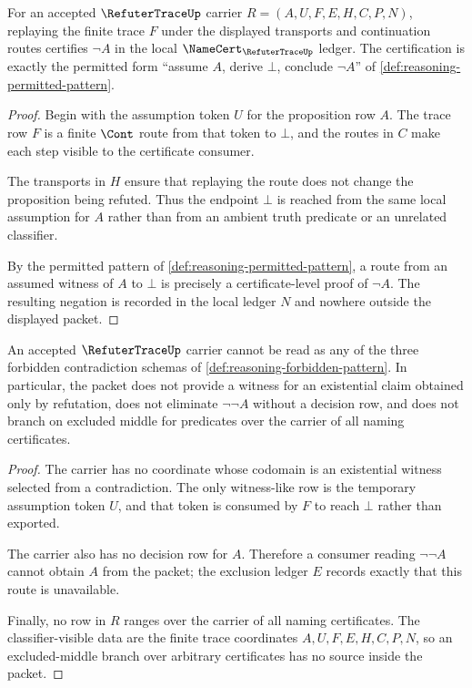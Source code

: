 \begin{theorem}
\label{thm:refuter-trace-permitted-refutation-soundness}
For an accepted $\RefuterTraceUp$ carrier $R=(A,U,F,E,H,C,P,N)$, replaying the finite trace $F$ under the displayed transports and continuation routes certifies $\neg A$ in the local $\NameCert_{\RefuterTraceUp}$ ledger. The certification is exactly the permitted form ``assume $A$, derive $\bot$, conclude $\neg A$'' of \autoref{def:reasoning-permitted-pattern}.
\end{theorem}
\begin{proof}
Begin with the assumption token $U$ for the proposition row $A$. The trace row $F$ is a finite $\Cont$ route from that token to $\bot$, and the routes in $C$ make each step visible to the certificate consumer.

The transports in $H$ ensure that replaying the route does not change the proposition being refuted. Thus the endpoint $\bot$ is reached from the same local assumption for $A$ rather than from an ambient truth predicate or an unrelated classifier.

By the permitted pattern of \autoref{def:reasoning-permitted-pattern}, a route from an assumed witness of $A$ to $\bot$ is precisely a certificate-level proof of $\neg A$. The resulting negation is recorded in the local ledger $N$ and nowhere outside the displayed packet.
\end{proof}

\begin{theorem}
\label{thm:refuter-trace-forbidden-branch-exclusion}
An accepted $\RefuterTraceUp$ carrier cannot be read as any of the three forbidden contradiction schemas of \autoref{def:reasoning-forbidden-pattern}. In particular, the packet does not provide a witness for an existential claim obtained only by refutation, does not eliminate $\neg\neg A$ without a decision row, and does not branch on excluded middle for predicates over the carrier of all naming certificates.
\end{theorem}
\begin{proof}
The carrier has no coordinate whose codomain is an existential witness selected from a contradiction. The only witness-like row is the temporary assumption token $U$, and that token is consumed by $F$ to reach $\bot$ rather than exported.

The carrier also has no decision row for $A$. Therefore a consumer reading $\neg\neg A$ cannot obtain $A$ from the packet; the exclusion ledger $E$ records exactly that this route is unavailable.

Finally, no row in $R$ ranges over the carrier of all naming certificates. The classifier-visible data are the finite trace coordinates $A,U,F,E,H,C,P,N$, so an excluded-middle branch over arbitrary certificates has no source inside the packet.
\end{proof}

